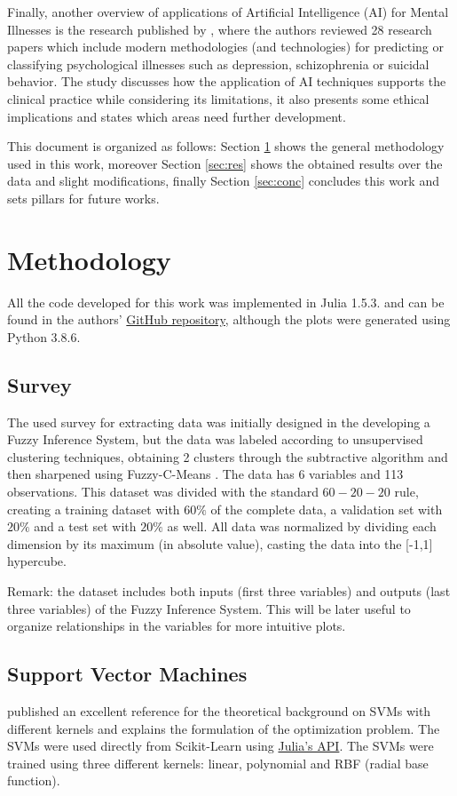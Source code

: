 \documentclass[conference]{IEEEtran}
\theoremstyle{definition}
\theoremstyle{remark}
\theoremstyle{remark}
\begin{document}
Finally, another overview of applications of Artificial Intelligence (AI) for
Mental Illnesses is the research published by \textcite{graham2019}, where the
authors reviewed 28 research papers which include modern methodologies (and
technologies) for predicting or classifying psychological illnesses such as
depression, schizophrenia or suicidal behavior. The study discusses how the
application of AI techniques supports the clinical practice while considering
its limitations, it also presents some ethical implications and states which
areas need further development.

This document is organized as follows: Section \ref{sec:meth} shows the general
methodology used in this work, moreover Section \ref{sec:res} shows the obtained
results over the data and slight modifications, finally Section \ref{sec:conc}
concludes this work and sets pillars for future works.

\section{Methodology}\label{sec:meth}
All the code developed for this work was implemented in Julia 1.5.3. and
can be found in the authors'
\href{https://github.com/juanscr/ai-works}{GitHub repository}, although the
plots were generated using Python 3.8.6.

\subsection{Survey}
The used survey for extracting data was initially designed in the developing a
Fuzzy Inference System, but the data was labeled according to unsupervised
clustering techniques, obtaining 2 clusters through the subtractive algorithm
\parencite{chiu1994} and then sharpened using Fuzzy-C-Means
\parencite{dunn1973}. The data has 6 variables and 113 observations. This
dataset was divided with the standard $60-20-20$ rule, creating a training
dataset with $60\%$ of the complete data, a validation set with $20\%$ and a
test set with $20\%$ as well. All data was normalized by dividing each dimension
by its maximum (in absolute value), casting the data into the [-1,1] hypercube.

Remark: the dataset includes both inputs (first three variables) and outputs
(last three variables) of the Fuzzy Inference System. This will be later useful
to organize relationships in the variables for more intuitive plots.

\subsection{Support Vector Machines}
\textcite{burges1998} published an excellent reference for the theoretical
background on SVMs with different kernels and explains the formulation of the
optimization problem. The SVMs were used directly from Scikit-Learn
\parencite{scikit-learn, sklearn_api} using
\href{https://bit.ly/3lDHADX}{Julia's API}. The SVMs were trained using three
different kernels: linear, polynomial and RBF (radial base function).
\end{document}
